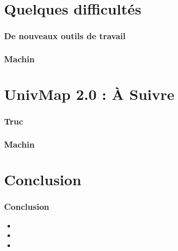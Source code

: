 \documentclass{beamer}
\begin{document}
\section{Quelques difficultés}
%
%
\begin{frame}
  \frametitle{De nouveaux outils de travail}
\end{frame}
%
%
\begin{frame}
  \frametitle{Machin}
\end{frame}
%
%
\section{UnivMap 2.0 : À Suivre}
%
%
\begin{frame}
  \frametitle{Truc}
\end{frame}
%
%
\begin{frame}
  \frametitle{Machin}
\end{frame}
%
%
\section{Conclusion}
%
%
\begin{frame}
  \frametitle{Conclusion}
  \begin{itemize}
    \item
    \item
    \item
  \end{itemize}
\end{frame}
%
%
\end{document}
